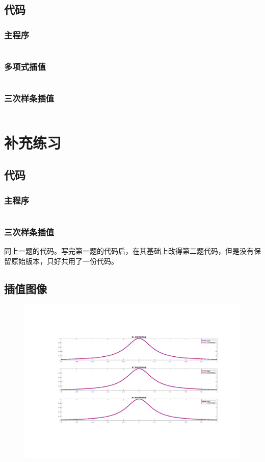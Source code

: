 \documentclass[a4paper]{article}
\newcommand{\matlabcode}[1]{
	\inputminted[mathescape,tabsize=2]
	{matlab}{../#1}
}
\begin{document}
\subsection{代码}
\subsubsection{主程序}
	\matlabcode{task1.m}
\subsubsection{多项式插值}
	\matlabcode{poly_interpolation.m}
\subsubsection{三次样条插值}
	\matlabcode{spline_interpolation.m}

\section{补充练习}
\subsection{代码}
\subsubsection{主程序}
	\matlabcode{main.m}
\subsubsection{三次样条插值}
	同上一题的代码。写完第一题的代码后，在其基础上改得第二题代码，但是没有保留原始版本，只好共用了一份代码。
\subsection{插值图像}
	\begin{figure}[ht]
		\includegraphics[width=1\textwidth]{figure/addtionpng.pdf}
	\end{figure}
\end{document}
